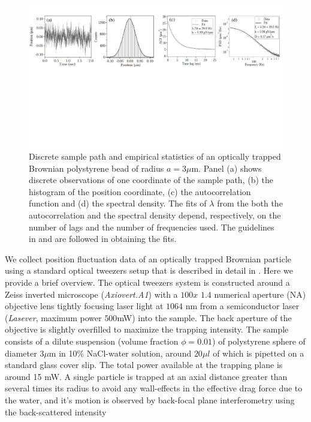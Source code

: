 \documentclass[english,aps, twocolumn, pre,superscriptaddress]{revtex4-1}
\begin{document}
\begin{figure}[t]
\includegraphics[scale=0.53]{figure2}

\caption{Discrete sample path and empirical statistics of an optically trapped
Brownian polystyrene bead of radius $a=3\mu$m. Panel (a) shows discrete
observations of one coordinate of the sample path, (b) the histogram
of the position coordinate, (c) the autocorrelation function and (d)
the spectral density. The fits of $\lambda$ from the both the autocorrelation
and the spectral density depend, respectively, on the number of lags
and the number of frequencies used. The guidelines in \cite{berg2004power}
and \cite{tassieri2012microrheology} are followed in obtaining the
fits. \label{fig:discrete-sample-path}}
\end{figure}
 We collect position fluctuation data of an optically trapped Brownian
particle using a standard optical tweezers setup that is described
in detail in \cite{rsi12}. Here we provide a brief overview. The
optical tweezers system is constructed around a Zeiss inverted microscope
(\emph{Axiovert.A1}) with a $100x$ $1.4$ numerical aperture (NA)
objective lens tightly focusing laser light at $1064$ nm from a semiconductor
laser (\emph{Lasever}, maximum power $500$mW) into the sample. The
back aperture of the objective is slightly overfilled to maximize
the trapping intensity. The sample consists of a dilute suspension
(volume fraction $\phi=0.01$) of polystyrene sphere of diameter $3\mu$m
in 10\% NaCl-water solution, around $20\mu l$ of which is pipetted
on a standard glass cover slip. The total power available at the trapping
plane is around 15 mW. A single particle is trapped at an axial distance
greater than several times its radius to avoid any wall-effects in
the effective drag force due to the water, and it's motion is observed
by back-focal plane interferometry using the back-scattered intensity
\end{document}
